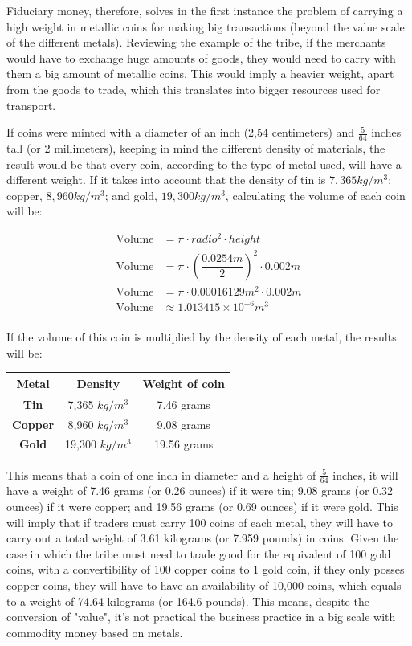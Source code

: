 \documentclass[12pt,a4paper,twoside]{book}
\begin{document}
Fiduciary money, therefore, solves in the first instance the problem of carrying a high weight in metallic coins for making big transactions (beyond the value scale of the different metals). Reviewing the example of the tribe, if the merchants would have to exchange huge amounts of goods, they would need to carry with them a big amount of metallic coins. This would imply a heavier weight, apart from the goods to trade, which this translates into bigger resources used for transport.

If coins were minted with a diameter of an inch (2,54 centimeters) and $ \frac{5}{64} $ inches tall (or 2 millimeters), keeping in mind the different density of materials, the result would be that every coin, according to the type of metal used, will have a different weight. If it takes into account that the density of tin is $ 7,365 kg/m^3 $; copper, $ 8,960 kg/m^3 $; and gold, $ 19,300 kg/m^3 $, calculating the volume of each coin will be:

\begin{align*}
\text{Volume} &= \pi \cdot radio^{2} \cdot height \\
\text{Volume} &= \pi \cdot \left( \dfrac{0.0254m}{2} \right)^{2} \cdot 0.002m \\
\text{Volume} &= \pi \cdot 0.00016129m^{2} \cdot 0.002m \\
\text{Volume} & \approx 1.013415 \times 10^{-6} m^{3} \\
\end{align*}

If the volume of this coin is multiplied by the density of each metal, the results will be:

\begin{center}
\begin{tabular}{|c|c|c|}
\hline 
\textbf{Metal} & \textbf{Density} & \textbf{Weight of coin} \\ 
\hline 
\textbf{Tin} & 7,365 $ kg/m^{3} $ & 7.46 grams \\ 
\hline 
\textbf{Copper} & 8,960 $ kg/m^{3} $ & 9.08 grams \\ 
\hline 
\textbf{Gold} & 19,300 $ kg/m^{3} $ & 19.56 grams \\ 
\hline 
\end{tabular} 
\end{center}

This means that a coin of one inch in diameter and a height of $ \frac{5}{64} $ inches, it will have a weight of 7.46 grams (or 0.26 ounces) if it were tin; 9.08 grams (or 0.32 ounces) if it were copper; and 19.56 grams (or 0.69 ounces) if it were gold. This will imply that if traders must carry 100 coins of each metal, they will have to carry out a total weight of 3.61 kilograms (or 7.959 pounds) in coins. Given the case in which the tribe must need to trade good for the equivalent of 100 gold coins, with a convertibility of 100 copper coins to 1 gold coin, if they only posses copper coins, they will have to have an availability of 10,000 coins, which equals to a weight of 74.64 kilograms (or 164.6 pounds). This means, despite the conversion of "value", it's not practical the business practice in a big scale with commodity money based on metals.
\end{document}
